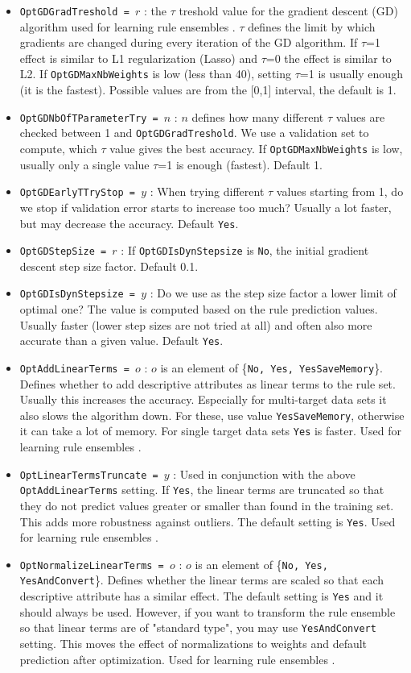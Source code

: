 \begin{itemize}
	\item \texttt{OptGDGradTreshold = $r$} : the $\tau$ treshold value for the gradient descent (GD) algorithm used for learning rule ensembles \cite{Aho2009}. $\tau$ defines the limit by which gradients are changed during every iteration of the GD algorithm. If $\tau$=1 effect is similar to L1 regularization (Lasso) and $\tau$=0 the effect is similar to L2. If \texttt{OptGDMaxNbWeights} is low (less than 40), setting $\tau$=1 is usually enough (it is the fastest). Possible values are from the [0,1] interval, the default is 1.
	\item \texttt{OptGDNbOfTParameterTry = $n$} : $n$ defines how many different $\tau$ values are checked between 1 and \texttt{Opt\-GD\-Grad\-Treshold}. We use a validation set to compute, which $\tau$ value gives the best accuracy. If \texttt{OptGDMaxNbWeights} is low, usually only a single value $\tau$=1 is enough (fastest). Default 1.
	\item \texttt{OptGDEarlyTTryStop = $y$} : When trying different $\tau$ values starting from 1, do we stop if validation error starts to increase too much? Usually a lot faster, but may decrease the accuracy. Default \texttt{Yes}.
	\item \texttt{OptGDStepSize = $r$} : If \texttt{OptGDIsDynStepsize} is \texttt{No}, the initial gradient descent step size factor. Default 0.1.
	\item \texttt{OptGDIsDynStepsize = $y$} : Do we use as the step size factor a lower limit of optimal one? The value is computed based on the rule prediction values. Usually faster (lower step sizes are not tried at all) and often also more accurate than a given value. Default \texttt{Yes}.
	\item \texttt{OptAddLinearTerms = $o$} : $o$ is an element of \{\texttt{No, Yes, YesSaveMemory}\}. Defines whether to add descriptive attributes as linear terms to the rule set. Usually this increases the accuracy. Especially for multi-target data sets it also slows the algorithm down. For these, use value \texttt{YesSaveMemory}, otherwise it can take a lot of memory. For single target data sets \texttt{Yes} is faster. Used for learning rule ensembles \cite{Aho2009}.
	\item \texttt{OptLinearTermsTruncate = $y$} : Used in conjunction with the above \texttt{OptAddLinearTerms} setting. If \texttt{Yes}, the linear terms are truncated so that they do not predict values greater or smaller than found in the training set. This adds more robustness against outliers. The default setting is \texttt{Yes}. Used for learning rule ensembles \cite{Aho2009}.
	\item \texttt{OptNormalizeLinearTerms = $o$} : $o$ is an element of \{\texttt{No, Yes, YesAndConvert}\}. Defines whether the linear terms are scaled so that each descriptive attribute has a similar effect. The default setting is \texttt{Yes} and it should always be used. However, if you want to transform the rule ensemble so that linear terms are of "standard type", you may use \texttt{YesAndConvert} setting. This moves the effect of normalizations to weights and default prediction after optimization. Used for learning rule ensembles \cite{Aho2009}.
\end{itemize}
